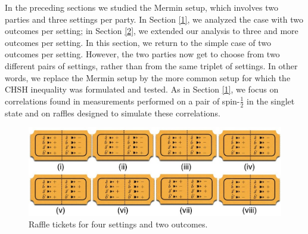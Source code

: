 
In the preceding sections we studied the Mermin setup, which involves two parties and three settings per party. In Section \ref{1}, we analyzed the case with two outcomes per setting; in Section \ref{2}, we extended our analysis to three and more outcomes per setting. In this section, we return to the simple case of two outcomes per setting. However, the two parties now get to choose from two different pairs of settings, rather than from the same triplet of settings. In other words, we replace the Mermin setup by the more common setup for which the CHSH inequality \citep{CHSH} was formulated and tested. As in Section \ref{1}, we focus on correlations found in measurements performed on a pair of spin-$\frac12$ in the singlet state and on raffles designed to simulate these correlations. 

\begin{figure}[h]
 \centering
   \includegraphics[width=6in]{raffle-tickets-4set2out-i-thru-viii.jpeg} 
   \caption{Raffle tickets for four settings and two outcomes.}
   \label{raffle-tickets-4set2out-i-thru-viii}
\end{figure}

